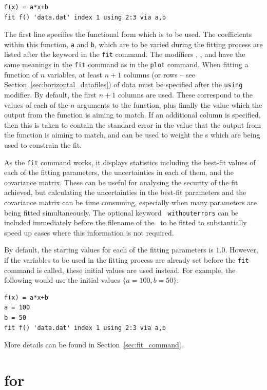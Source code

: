 \begin{verbatim}
f(x) = a*x+b
fit f() 'data.dat' index 1 using 2:3 via a,b
\end{verbatim}

\noindent The first line specifies the functional form which is to be used.
The coefficients within this function, {\tt a} and {\tt b}, which are to be
varied during the fitting process are listed after the keyword 
in the {\tt fit} command.  The modifiers , ,
 and  have the same meanings in the {\tt fit}
command as in the {\tt plot} command. When fitting a function of $n$
variables, at least $n+1$ columns (or rows -- see
Section~\ref{sec:horizontal_datafiles}) of data must be specified after the {\tt using}
modifier. By default, the first $n+1$ columns are used. These correspond to the
values of each of the $n$ arguments to the function, plus finally the value which
the output from the function is aiming to match.  If an additional column is
specified, then this is taken to contain the standard error in the value that
the output from the function is aiming to match, and can be used to weight the
\datapoint s which are being used to constrain the fit.

As the {\tt fit} command works, it displays statistics including the best-fit
values of each of the fitting parameters, the uncertainties in each of them,
and the covariance matrix. These can be useful for analysing the security of
the fit achieved, but calculating the uncertainties in the best-fit parameters
and the covariance matrix can be time consuming, especially when many
parameters are being fitted simultaneously. The optional keyword {\tt
withouterrors} can be included immediately before the filename of the
\datafile\ to be fitted to substantially speed up cases where this information
is not required.

By default, the starting values for each of the fitting parameters is
$1.0$. However, if the variables to be used in the fitting process are already
set before the {\tt fit} command is called, these initial values are used
instead. For example, the following would use the initial values
$\{a=100,b=50\}$:
\begin{verbatim}
f(x) = a*x+b
a = 100
b = 50
fit f() 'data.dat' index 1 using 2:3 via a,b
\end{verbatim}

More details can be found in Section~\ref{sec:fit_command}.


\section{for}

